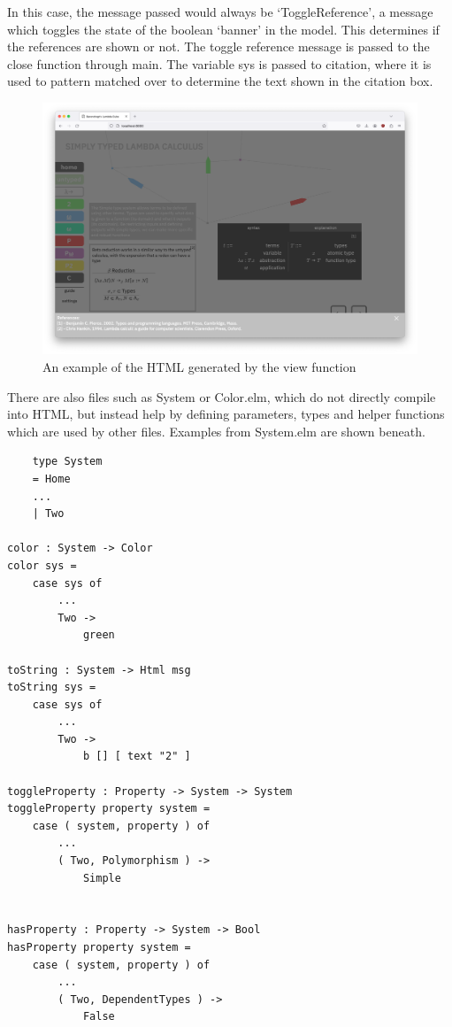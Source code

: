 \documentclass{l4proj}
\begin{document}
In this case, the message passed would always be `ToggleReference', a message which toggles the state of the boolean `banner' in the model.  This determines if the references are shown or not.  The toggle reference message is passed to the close function through main.  The variable sys is passed to citation, where it is used to pattern matched over to determine the text shown in the citation box.

\begin{figure}[h!]
    \centering
    \includegraphics[width=0.8\linewidth]{dissertation/images/final_citations.png}
    \caption{An example of the HTML generated by the view function}
    \label{fig:enter-label}
\end{figure}

There are also files such as System or Color.elm, which do not directly compile into HTML, but instead help by defining parameters, types and helper functions which are used by other files.  Examples from System.elm are shown beneath.

\begin{lstlisting}
    type System
    = Home
    ...
    | Two

color : System -> Color
color sys =
    case sys of
        ...
        Two ->
            green

toString : System -> Html msg
toString sys =
    case sys of
        ...
        Two ->
            b [] [ text "2" ]

toggleProperty : Property -> System -> System
toggleProperty property system =
    case ( system, property ) of
        ...
        ( Two, Polymorphism ) ->
            Simple


hasProperty : Property -> System -> Bool
hasProperty property system =
    case ( system, property ) of
        ...
        ( Two, DependentTypes ) ->
            False
\end{lstlisting}
\end{document}
